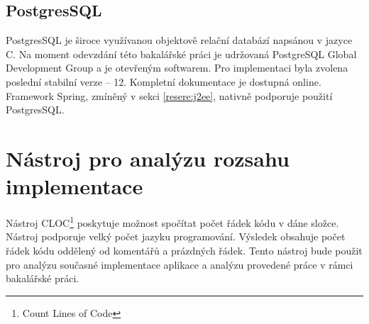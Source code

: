     \subsection{PostgresSQL}
        PostgresSQL je široce využívanou objektově relační databází napsánou v jazyce C. Na moment odevzdání této bakalářské práci je udržovaná PostgreSQL Global Development Group a je otevřeným softwarem. Pro implementaci byla zvolena poslední stabilní verze -- 12. Kompletní dokumentace je dostupná online\cite{postgres-documentation}. Framework Spring, zmíněný v sekci \ref{resere:j2ee}, nativně podporuje použití PostgresSQL\cite{spring-data-postgres}.
        

\section{Nástroj pro analýzu rozsahu implementace}\label{reserse:cloc}
    Nástroj CLOC\footnote{Count Lines of Code}\cite{cloc-download} poskytuje možnost spočítat počet řádek kódu v dáne složce. Nástroj podporuje velký počet jazyku programování. Výsledek obsahuje počet řádek kódu oddělený od komentářů a prázdných řádek. Tento nástroj bude použit pro analýzu současné implementace aplikace a analýzu provedené práce v rámci bakalářské práci.